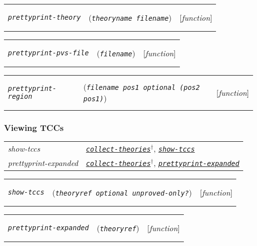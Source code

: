 \documentclass[12pt]{book}
\makeatletter
\def\ampoptional{{\smaller\sc {\smaller\smaller \&}optional\ }}
\newenvironment{function}[3]%
{\par\noindent\begin{boxedminipage}{\textwidth}%
 \par\noindent\begin{tabularx}{\linewidth}{l>{\raggedright}Xr}%
 \functionhtgt{#1}&(\texttt{\textit{#2}})&[\emph{#3}]%
 \end{tabularx}\par\flushright\begin{minipage}{.97\textwidth}}
{\end{minipage}\end{boxedminipage}}
\newcommand{\functionnm}[1]{\texttt{\textit{#1}}}
\newcommand{\functionhln}[1]{\hyperlink{#1}{\functionnm{#1}}}
\newcommand{\functionhtgt}[1]{\hypertarget{#1}{\functionnm{#1}}\index{#1@\functionnm{#1}|underline}}
\newenvironment{lispfunction}[2]%
{\begin{function}{#1}{#2}{function}}{\end{function}}
\makeatother
\begin{document}
\begin{lispfunction}{prettyprint-theory}{theoryname filename}
\end{lispfunction}

\begin{lispfunction}{prettyprint-pvs-file}{filename}
\end{lispfunction}

\begin{lispfunction}{prettyprint-region}
  {filename pos1 \ampoptional (pos2 pos1)}
\end{lispfunction}

\subsubsection{Viewing TCCs}
\noindent\begin{tabularx}{\linewidth}{|>{\itshape\ttfamily}l|>{\raggedright\arraybackslash}X|}\hline
  show-tccs & \functionhln{collect-theories}$^\dagger$,
              \functionhln{show-tccs} \\
  prettyprint-expanded & \functionhln{collect-theories}$^\dagger$,
                         \functionhln{prettyprint-expanded} \\ \hline
\end{tabularx}

\begin{lispfunction}{show-tccs}{theoryref \ampoptional unproved-only?}
\end{lispfunction}

\begin{lispfunction}{prettyprint-expanded}{theoryref}
\end{lispfunction}
\end{document}
